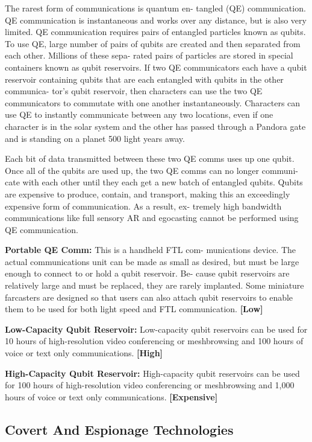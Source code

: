 The rarest form of communications is quantum en-
tangled (QE) communication. QE communication is 
instantaneous and works over any distance, but is 
also very limited. QE communication requires pairs 
of entangled particles known as qubits. To use QE, 
large number of pairs of qubits are created and then 
separated from each other. Millions of these sepa-
rated pairs of particles are stored in special containers 
known as qubit reservoirs. If two QE communicators 
each have a qubit reservoir containing qubits that are 
each entangled with qubits in the other communica-
tor's qubit reservoir, then characters can use the two 
QE communicators to commutate with one another 
instantaneously. Characters can use QE to instantly 
communicate between any two locations, even if one 
character is in the solar system and the other has 
passed through a Pandora gate and is standing on a 
planet 500 light years away.

Each bit of data transmitted between these two QE 
comms uses up one qubit. Once all of the qubits are 
used up, the two QE comms can no longer communi-
cate with each other until they each get a new batch 
of entangled qubits. Qubits are expensive to produce, 
contain, and transport, making this an exceedingly 
expensive form of communication. As a result, ex-
tremely high bandwidth communications like full 
sensory AR and egocasting cannot be performed using 
QE communication.

\textbf{Portable QE Comm: }This is a handheld FTL com-
munications device. The actual communications unit 
can be made as small as desired, but must be large 
enough to connect to or hold a qubit reservoir. Be-
cause qubit reservoirs are relatively large and must be 
replaced, they are rarely implanted. Some miniature 
farcasters are designed so that users can also attach 
qubit reservoirs to enable them to be used for both 
light speed and FTL communication. \textbf{[Low]}

\textbf{Low-Capacity Qubit Reservoir:} Low-capacity qubit 
reservoirs can be used for 10 hours of high-resolution 
video conferencing or meshbrowsing and 100 hours 
of voice or text only communications. \textbf{[High]}

\textbf{High-Capacity Qubit Reservoir:} High-capacity qubit 
reservoirs can be used for 100 hours of high-resolution 
video conferencing or meshbrowsing and 1,000 hours 
of voice or text only communications. \textbf{[Expensive]}

\subsection{Covert And Espionage Technologies}

